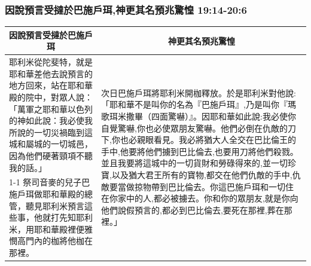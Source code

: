 \subsubsection{因說預言受撻於巴施戶珥,神更其名預兆驚惶 19:14-20:6}
\begin{table}[H]
\centering
\begin{tabular}{p{}|p{10.50cm}}\hline\hline
\multicolumn{1}{c|}{因說預言受撻於巴施戶珥}&\multicolumn{1}{c}{神更其名預兆驚惶}\\\hline
耶利米從陀斐特，就是耶和華差他去說預言的地方回來，站在耶和華殿的院中，對眾人說：「萬軍之耶和華以色列的神如此說：我必使我所說的一切災禍臨到這城和屬城的一切城邑，因為他們硬著頸項不聽我的話。」
&\multirow{2}{10.76cm}{次日巴施戶珥將耶利米開枷釋放。於是耶利米對他說:「耶和華不是叫你的名為『巴施戶珥』,乃是叫你『瑪歌珥米撒畢（四面驚嚇）』。因耶和華如此說:我必使你自覺驚嚇,你也必使眾朋友驚嚇。他們必倒在仇敵的刀下,你也必親眼看見。我必將猶大人全交在巴比倫王的手中,他要將他們擄到巴比倫去,也要用刀將他們殺戮。並且我要將這城中的一切貨財和勞碌得來的,並一切珍寶,以及猶大君王所有的寶物,都交在他們仇敵的手中,仇敵要當做掠物帶到巴比倫去。你這巴施戶珥和一切住在你家中的人,都必被擄去。你和你的眾朋友,就是你向他們說假預言的,都必到巴比倫去,要死在那裡,葬在那裡。」}\\\cline{1-1}
祭司音麥的兒子巴施戶珥做耶和華殿的總管，聽見耶利米預言這些事，他就打先知耶利米，用耶和華殿裡便雅憫高門內的枷將他枷在那裡。&\\\hline
\end{tabular}
\end{table}


